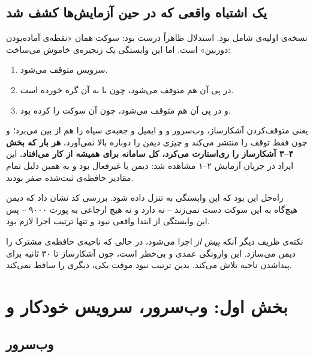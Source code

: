 \subsection{یک اشتباه واقعی که در حین آزمایش‌ها کشف شد}

نسخه‌ی اولیه‌ی  شامل  بود. استدلال ظاهراً درست بود: سوکت همان «نقطه‌ی آماده‌بودن دوربین» است. اما این وابستگی یک زنجیره‌ی خاموش می‌ساخت:

\begin{enumerate}
	\item سرویس  متوقف می‌شود.
	\item در پی آن  هم متوقف می‌شود، چون با  به آن گره خورده است.
	\item و در پی آن  هم متوقف می‌شود، چون آن سوکت را  کرده بود.
\end{enumerate}

یعنی متوقف‌کردن آشکارساز، وب‌سرور و  و ایمیل و جعبه‌ی سیاه را هم از بین می‌برد؛ و چون  فقط توقف را منتشر می‌کند و چیزی دیمن را دوباره بالا نمی‌آورد، \textbf{هر بار که  بخش ۴--۳ آشکارساز را ری‌استارت می‌کرد، کل سامانه برای همیشه از کار می‌افتاد.} این ایراد در جریان آزمایش ۲--۱ مشاهده شد: دیمن با  غیرفعال بود و به همین دلیل تمام مقادیر حافظه‌ی ثبت‌شده صفر بودند.

راه‌حل این بود که این وابستگی به  تنزل داده شود. بررسی کد نشان داد که دیمن  هیچ‌گاه به این سوکت دست نمی‌زند -- نه  دارد و نه هیچ ارجاعی به پورت ۹۰۰۰ -- پس این وابستگی از ابتدا واقعی نبود و تنها ترتیب اجرا لازم بود.

نکته‌ی ظریف دیگر آنکه  \emph{پیش از}  اجرا می‌شود، در حالی که ناحیه‌ی حافظه‌ی مشترک را دیمن  می‌سازد. این وارونگی عمدی و بی‌خطر است، چون آشکارساز تا ۳۰ ثانیه برای پیداشدن ناحیه تلاش می‌کند. بدین ترتیب نبود موقت یکی، دیگری را ساقط نمی‌کند.

\section{بخش اول: وب‌سرور، سرویس خودکار و }

\subsection{وب‌سرور}

